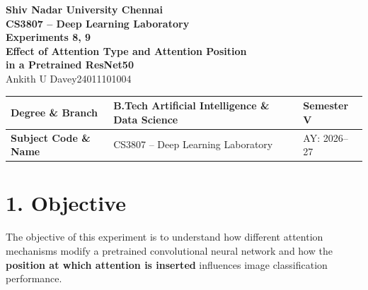 \documentclass[10pt]{article}
\begin{document}

\begin{center}

{\large\textbf{Shiv Nadar University Chennai}}\\[2mm]

{\normalsize\textbf{CS3807 -- Deep Learning Laboratory}}\\[2mm]

{\large\textbf{Experiments 8, 9}}\\[1mm]

{\normalsize
\textbf{
Effect of Attention Type and Attention Position\\
in a Pretrained ResNet50
}}\\[4mm]
Ankith U Davey\hspace{1.2em}24011101004

\end{center}

\vspace{3mm}


\begin{center}
\begin{tabular}{|p{3.5cm}|p{8.7cm}|p{2.1cm}|}
\hline
\textbf{Degree \& Branch}
&
B.Tech Artificial Intelligence \& Data Science
&
Semester V
\\
\hline

\textbf{Subject Code \& Name}
&
CS3807 -- Deep Learning Laboratory
&
AY: 2026--27
\\
\hline

\end{tabular}
\end{center}

\section*{1. Objective}

The objective of this experiment is to understand how different attention
mechanisms modify a pretrained convolutional neural network and how the
\textbf{position at which attention is inserted} influences image
classification performance.
\end{document}

